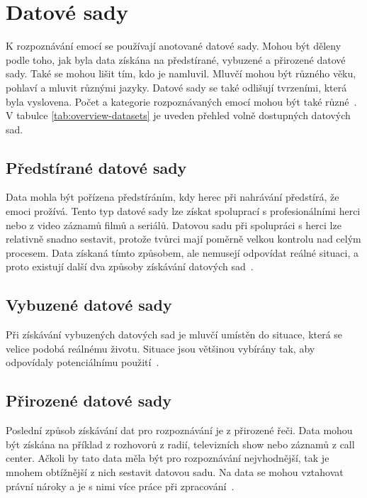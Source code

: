 \documentclass[FM,BP]{tulthesis}
\begin{document}
\chapter{Datové sady} %
K rozpoznávání emocí se používají anotované datové sady. Mohou být děleny podle toho, jak byla data získána na předstírané, vybuzené a přirozené datové sady. Také se mohou lišit tím, kdo je namluvil. Mluvčí mohou být různého věku, pohlaví a mluvit různými jazyky. Datové sady se také odlišují tvrzeními, která byla vyslovena. Počet a kategorie rozpoznávaných emocí mohou být také různé~\cite{DBLP:journals/speech/AkcayO20}. V tabulce \ref{tab:overview-datasets} je uveden přehled volně dostupných datových sad.

\section{Předstírané datové sady} %
Data mohla být pořízena předstíráním, kdy herec při nahrávání předstírá, že emoci prožívá. Tento typ datové sady lze získat spoluprací s profesionálními herci nebo z video záznamů filmů a seriálů. Datovou sadu při spolupráci s herci lze relativně snadno sestavit, protože tvůrci mají poměrně velkou kontrolu nad celým procesem. Data získaná tímto způsobem, ale nemusejí odpovídat reálné situaci, a proto existují další dva způsoby získávání datových sad~\cite{konar_chakraborty_2015}.

\section{Vybuzené datové sady} %
Při získávání vybuzených datových sad je mluvčí umístěn do situace, která se velice podobá reálnému životu. Situace jsou většinou vybírány tak, aby odpovídaly potenciálnímu použití~\cite{konar_chakraborty_2015}.

\section{Přirozené datové sady} %
Poslední způsob získávání dat pro rozpoznávání je z přirozené řeči. Data mohou být získána na příklad z rozhovorů z radií, televizních show nebo záznamů z call center. Ačkoli by tato data měla být pro rozpoznávání nejvhodnější, tak je mnohem obtížnější z nich sestavit datovou sadu. Na data se mohou vztahovat právní nároky a je s nimi více práce při zpracování~\cite{DBLP:journals/speech/AkcayO20}.
\end{document}
